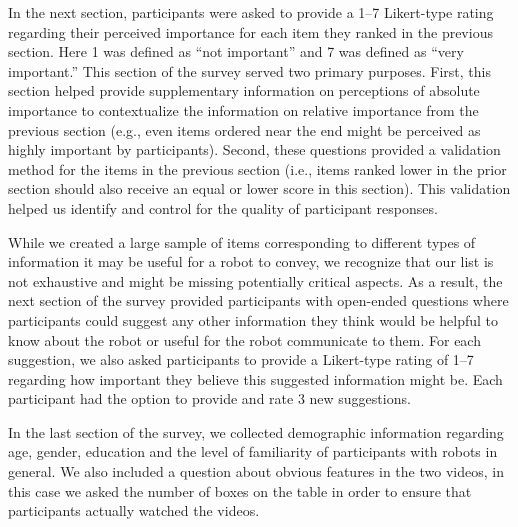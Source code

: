\documentclass[letterpaper, 10 pt, conference]{ieeeconf}  %
\begin{document}
    In the next section, participants were asked to provide a 1--7 Likert-type rating regarding their perceived importance for each item they ranked in the previous section. Here 1 was defined as ``not important'' and 7 was defined as ``very important.'' This section of the survey served two primary purposes. First, this section helped provide supplementary information on perceptions of absolute importance to contextualize the information on relative importance from the previous section (e.g., even items ordered near the end might be perceived as highly important by participants). Second, these questions provided a validation method for the items in the previous section (i.e., items ranked lower in the prior section should also receive an equal or lower score in this section). This validation helped us identify and control for the quality of participant responses. %

    While we created a large sample of items corresponding to different types of information it may be useful for a robot to convey, we recognize that our list is not exhaustive and might be missing potentially critical aspects. As a result, the next section of the survey provided participants with open-ended questions where participants could suggest any other information they think would be helpful to know about the robot or useful for the robot communicate to them. For each suggestion, we also asked participants to provide a Likert-type rating of 1--7 regarding how important they believe this suggested information might be. Each participant had the option to provide and rate 3 new suggestions. %

    In the last section of the survey, we collected demographic information regarding age, gender, education and the level of familiarity of participants with robots in general. We also included a question about obvious features in the two videos, in this case we asked the number of boxes on the table in order to ensure that participants actually watched the videos.
\end{document}
